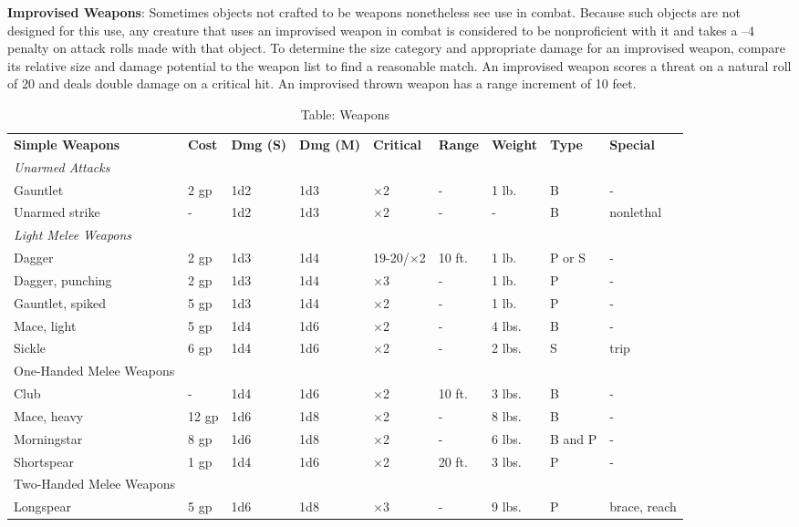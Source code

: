 \textbf{Improvised Weapons}: Sometimes objects not crafted to be weapons nonetheless see use in combat. Because such objects are not designed for this use, any creature that uses an improvised weapon in combat is considered to be nonproficient with it and takes a --4 penalty on attack rolls made with that object. To determine the size category and appropriate damage for an improvised weapon, compare its relative size and damage potential to the weapon list to find a reasonable match. An improvised weapon scores a threat on a natural roll of 20 and deals double damage on a critical hit. An improvised thrown weapon has a range increment of 10 feet.
\begin{table*}[]
\sffamily
\setlength{\tabcolsep}{1pt}
\caption{Table: Weapons}
\begin{tabular}{lllllllll}
\textbf{Simple Weapons} & \textbf{Cost} & \textbf{Dmg (S)} & \textbf{Dmg (M)} & \textbf{Critical} & \textbf{Range} & \textbf{Weight} & \textbf{Type} & \textbf{Special}\\
\textit{Unarmed Attacks} \\
 Gauntlet & 2 gp & 1d2 & 1d3 & $\times$2 & - & 1 lb. & B & - \\
 Unarmed strike & - & 1d2 & 1d3 & $\times$2 & - & - & B & nonlethal \\
\textit{Light Melee Weapons} \\
 Dagger & 2 gp & 1d3 & 1d4 & 19-20/$\times$2 & 10 ft. & 1 lb. & P or S & - \\
 Dagger, punching & 2 gp & 1d3 & 1d4  & $\times$3 & - & 1 lb. & P & - \\
 Gauntlet, spiked & 5 gp & 1d3 & 1d4 & $\times$2 & - & 1 lb. & P & - \\
 Mace, light & 5 gp & 1d4 & 1d6 & $\times$2 & - & 4 lbs. & B & - \\
 Sickle & 6 gp & 1d4 & 1d6 & $\times$2 & - & 2 lbs. & S & trip \\
 One-Handed Melee Weapons \\
 Club & - & 1d4 & 1d6 & $\times$2 & 10 ft. & 3 lbs. & B & - \\
 Mace, heavy & 12 gp & 1d6 & 1d8 & $\times$2 & - & 8 lbs. & B & - \\
 Morningstar & 8 gp & 1d6 & 1d8 & $\times$2 & - & 6 lbs. & B and P & - \\
 Shortspear & 1 gp & 1d4 & 1d6 & $\times$2 & 20 ft. & 3 lbs. & P & - \\
 Two-Handed Melee Weapons \\
 Longspear & 5 gp & 1d6 & 1d8 & $\times$3 & - & 9 lbs. & P & brace, reach \\

\end{tabular}
\end{table*}

